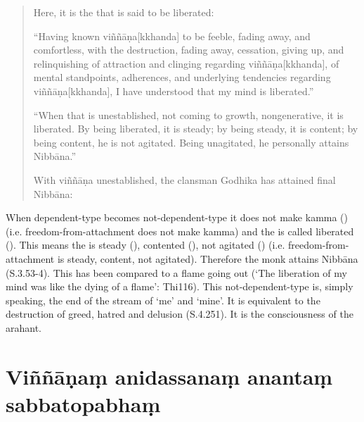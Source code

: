 \begin{quote}
Here, it is the  that is said to be liberated:

``Having known viññāṇa[kkhanda] to be feeble, fading away, and comfortless, with the destruction, fading away, cessation, giving up, and relinquishing of attraction and clinging regarding viññāṇa[kkhanda], of mental standpoints, adherences, and underlying tendencies regarding viññāṇa[kkhanda], I have understood that my mind is liberated.''


``When that  is unestablished, not coming to growth, nongenerative, it is liberated. By being liberated, it is steady; by being steady, it is content; by being content, he is not agitated. Being unagitated, he personally attains Nibbāna.''


With viññāṇa unestablished, the clansman Godhika has attained final Nibbāna: 
\end{quote}

When dependent-type  becomes not-dependent-type it does not make kamma () (i.e. freedom-from-attachment does not make kamma) and the  is called liberated (). This means the  is steady (), contented (), not agitated () (i.e. freedom-from-attachment is steady, content, not agitated). Therefore the monk attains Nibbāna (S.3.53-4). This has been compared to a flame going out (`The liberation of my mind was like the dying of a flame': Thi116). This not-dependent-type  is, simply speaking, the end of the stream of `me' and `mine'. It is equivalent to the destruction of greed, hatred and delusion (S.4.251). It is the consciousness of the arahant.

\section*{Vi\~n\~n\=a\d{n}a\d{m} anidassana\d{m} ananta\d{m} sabbatopabha\d{m}}

